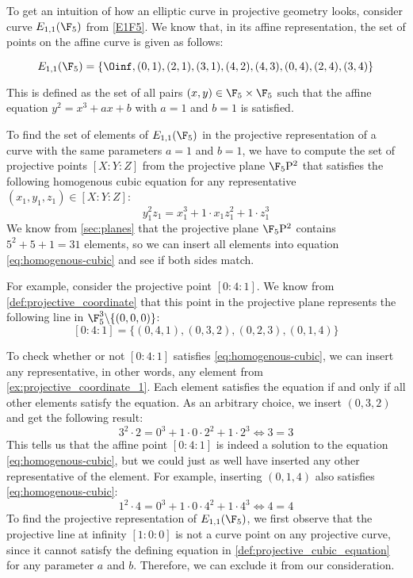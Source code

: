 \begin{example}
\label{ex:E1F5-projective}
 To get an intuition of how an elliptic curve in projective geometry looks, consider curve $E_{1,1}(\F_5)$ from \examplename{} \ref{E1F5}. We know that, in its affine representation, the set of points on the affine  curve is given as follows:

\begin{equation}\label{eq:E1F5-affine}
E_{1,1}(\F_5) = \{\Oinf, (0,1),(2,1),(3,1),(4,2),(4,3),(0,4),(2,4),(3,4)\}
\end{equation}

This is defined as the set of all pairs $(x,y)\in \F_5\times \F_5$ such that the affine  equation $y^2 = x^3 + ax +b$ with $a=1$ and $b=1$ is satisfied.

To find the set of elements of $E_{1,1}(\F_5)$ in the projective representation of a  curve with the same parameters $a=1$ and $b=1$, we have to compute the set of projective points $[X:Y:Z]$ from the projective plane $\F_5\mathrm{P}^2$ that satisfies the following homogenous cubic equation for any representative $(x_1,y_1,z_1)\in [X:Y:Z]$:
\begin{equation}\label{eq:homogenous-cubic}
y_1^2z_1 = x_1^3 + 1\cdot x_1 z_1^2 + 1\cdot z_1^3
\end{equation}
We know from \secname{} \ref{sec:planes} that the projective plane $\F_5\mathrm{P}^2$ contains $5^2+5+1= 31$ elements, so we can insert all elements into equation \eqref{eq:homogenous-cubic} and see if both sides match.

For example, consider the projective point $[0:4:1]$. We know from \eqref{def:projective_coordinate} that this point in the projective plane represents the following line in $\F_5^3\backslash\{(0,0,0)\}$:
\begin{equation}
\label{ex:projective_coordinate_1}
[0:4:1] = \{(0,4,1),(0,3,2),(0,2,3),(0,1,4)\}
\end{equation} 

To check whether or not $[0:4:1]$ satisfies \eqref{eq:homogenous-cubic}, we can insert any representative, in other words, any element from  \eqref{ex:projective_coordinate_1}. Each element satisfies the equation if and only if all other elements satisfy the equation. As an arbitrary choice, we insert $(0,3,2)$ and get the following result:
$$
3^2\cdot 2 = 0^3 + 1\cdot 0\cdot 2^2 + 1\cdot 2^3 \Leftrightarrow
3 = 3
$$
This tells us that the affine point $[0:4:1]$ is indeed a solution to the equation \eqref{eq:homogenous-cubic}, but we could just as well have inserted any other representative of the element. For example, inserting $(0,1,4)$ also satisfies \eqref{eq:homogenous-cubic}: 
$$
1^2\cdot 4 = 0^3 + 1\cdot 0\cdot 4^2 + 1\cdot 4^3 \Leftrightarrow
4=4
$$
To find the projective representation of $E_{1,1}(\F_5)$, we first observe that the projective line at infinity $[1:0:0]$ is not a curve point on any projective  curve, since it cannot satisfy the defining equation in \eqref{def:projective_cubic_equation} for any parameter $a$ and $b$. Therefore, we can exclude it from our consideration. 


\end{example}
